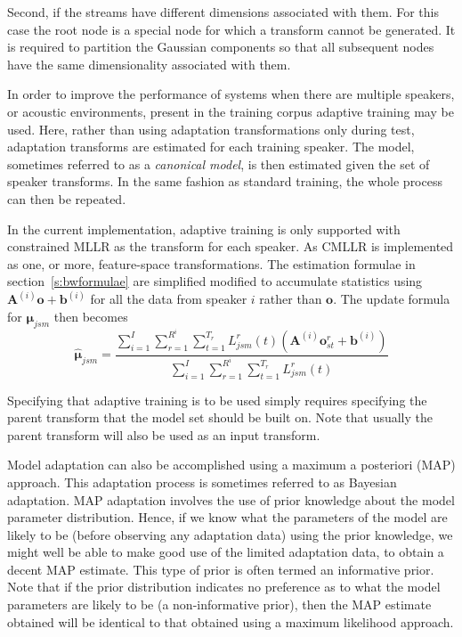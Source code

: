 Second, if the streams have different dimensions associated with them. For
this case the root node is a special node for which a transform cannot be 
generated. It is required to partition the Gaussian components so that 
all subsequent nodes have the same dimensionality associated with them.


In order to improve the performance of systems when there are multiple
speakers, or acoustic environments, present in the training corpus 
adaptive training may be used. Here, rather than using adaptation
transformations only during test, adaptation transforms are estimated
for each training speaker. The model, sometimes referred to as a {\em canonical
model}, is then estimated given the set of speaker transforms. In the
same fashion as standard training, the whole process can then be repeated.

In the current implementation, adaptive training is only supported
with constrained MLLR as the transform for each speaker. As CMLLR is
implemented as one, or more, feature-space transformations. The
estimation formulae in section~\ref{s:bwformulae} are simplified
modified to accumulate statistics using
$\bm{A}^{(i)}\bm{o}+\bm{b}^{(i)}$ for all the data from speaker $i$
rather than $\bm{o}$. The update formula for $\bm{\mu}_{jsm}$ then
becomes
\newcommand{\satliksum}[1]{
                  \sum_{i=1}^I\sum_{r=1}^{R^i}  \sum_{t=1}^{T_r} L^r_{#1}(t)
}
\[
   \hat{\bm{\mu}}_{jsm} = \frac{
                \satliksum{jsm}(\bm{A}^{(i)}\bm{o}^r_{st}+\bm{b}^{(i)})}{\satliksum{jsm}}
\]

Specifying that adaptive training is to be used simply requires specifying
the parent transform that the model set should be built on. Note that usually
the parent transform will also be used as an input transform.


Model adaptation can also be accomplished using a maximum a
posteriori (MAP) approach. 
This adaptation process is sometimes
referred to as Bayesian adaptation. MAP adaptation involves the use 
of prior knowledge about the model parameter distribution.
Hence, if we know what the parameters of the model are
likely to be (before observing any adaptation data) using the prior
knowledge, we might well be able to make good use of the limited
adaptation data, to obtain a decent MAP estimate. This type of prior
is often termed an informative prior.
Note that if the prior
distribution indicates no preference as to what the model parameters
are likely to be (a non-informative prior), then the MAP estimate
obtained will be identical to that obtained using a maximum likelihood
approach.

